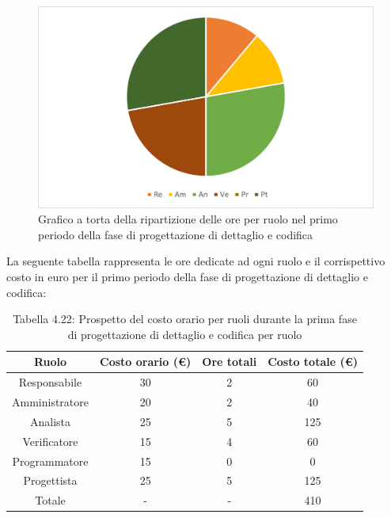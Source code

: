 \begin{figure}[H]
    \centering
    \includegraphics[scale=0.6]{img/grafi preventivo/torta/codifica/periodo1.png}
    \caption{Grafico a torta della ripartizione delle ore per ruolo nel primo periodo della fase di progettazione di dettaglio e codifica}
\end{figure}
La seguente tabella rappresenta le ore dedicate ad ogni ruolo e il corrispettivo costo in euro per il primo periodo della fase di progettazione di dettaglio e codifica:
\begin{table}[h]
	\setlength\extrarowheight{5pt}
	\centering
	\begin{tabularx}{\textwidth}{|ccc|c|}
		\hline
		\rowcolor{white}
		\textbf{Ruolo} & \textbf{Costo orario (€)} & \textbf{Ore totali} & \textbf{Costo totale (€)} \\
		\hline
		Responsabile &30&2&60 \\
		Amministratore &20&2&40 \\
		Analista &25&5&125 \\
		Verificatore &15&4&60 \\
		Programmatore &15&0&0 \\
		Progettista &25&5&125 \\
		\hline
		Totale &-&-&410 \\
		\hline
	\end{tabularx}
    \vspace{10pt}
	\caption{Tabella 4.22: Prospetto del costo orario per ruoli durante la prima fase di progettazione di dettaglio e codifica per ruolo}
\end{table}
%
\newpage
